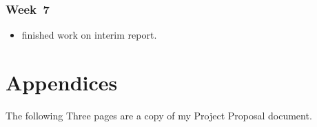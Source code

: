 \documentclass[a4paper]{report}
\begin{document}
\subsection*{Week 7}
\begin{itemize}
\item finished work on interim report.
\end{itemize}

\chapter*{Appendices}

The following Three pages are a copy of my Project Proposal document.








\end{document}

